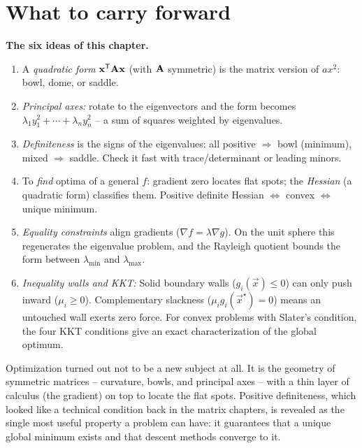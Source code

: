 \section{What to carry forward}
\label{ch36:summary}

\begin{focusbox}
\textbf{The six ideas of this chapter.}
\begin{enumerate}
\item A \emph{quadratic form} $\mathbf{x}^{\mathsf{T}}\mathbf{A}\mathbf{x}$ (with $\mathbf{A}$ symmetric) is
the matrix version of $ax^2$: bowl, dome, or saddle.
\item \emph{Principal axes:} rotate to the eigenvectors and the form becomes
$\lambda_1 y_1^2+\cdots+\lambda_n y_n^2$ -- a sum of squares weighted by eigenvalues.
\item \emph{Definiteness} is the signs of the eigenvalues: all positive
$\Rightarrow$ bowl (minimum), mixed $\Rightarrow$ saddle. Check it fast with
trace/determinant or leading minors.
\item To \emph{find} optima of a general $f$: gradient zero locates flat spots; the
\emph{Hessian} (a quadratic form) classifies them. Positive definite Hessian
$\Leftrightarrow$ convex $\Leftrightarrow$ unique minimum.
\item \emph{Equality constraints} align gradients ($\nabla f=\lambda\nabla g$). On the
unit sphere this regenerates the eigenvalue problem, and the Rayleigh quotient bounds
the form between $\lambda_{\min}$ and $\lambda_{\max}$.
\item \emph{Inequality walls and KKT:} Solid boundary walls ($g_i(\vec{x})\le 0$) can
only push inward ($\mu_i \ge 0$). Complementary slackness ($\mu_i g_i(\vec{x}^\star) = 0$)
means an untouched wall exerts zero force. For convex problems with Slater's condition,
the four KKT conditions give an exact characterization of the global optimum.
\end{enumerate}
\end{focusbox}

Optimization turned out not to be a new subject at all. It is the geometry of
symmetric matrices -- curvature, bowls, and principal axes -- with a thin layer of
calculus (the gradient) on top to locate the flat spots. Positive definiteness, which
looked like a technical condition back in the matrix chapters, is revealed as the
single most useful property a problem can have: it guarantees that a unique global
minimum exists and that descent methods converge to it.

